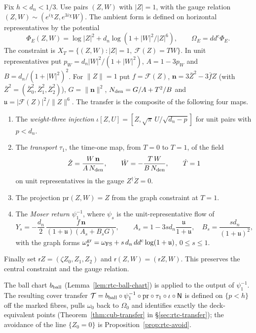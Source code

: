 \begin{construction}\label{cons:cub-transfer}
Fix $h<d_n<1/3$. Use pairs $(Z,W)$ with $|Z|=1$, with the gauge relation
$(Z,W)\sim(e^{i\chi}Z,e^{3i\chi}W)$.
The ambient form is defined on horizontal representatives by the potential
\[
 \Phi_E(Z,W)=\log|Z|^2+d_n\log(1+|W|^2/|Z|^6),\qquad \Omega_E=dd^c\Phi_E.
\]
The constraint is $X_T=\{(Z,W):|Z|=1,\ \mathcal F(Z)=TW\}$.
In unit representatives put $p_W=d_n|W|^2/(1+|W|^2)$, $A=1-3p_W$ and $B=d_n/(1+|W|^2)^2$. For $\|Z\|=1$ put
$f=\mathcal F(Z)$, $\mathbf n=3\bar Z^{2}-3\bar fZ$ (with $\bar Z^2=(\bar Z_0^2,\bar Z_1^2,\bar Z_2^2)$), $G=\|\mathbf n\|^2$,
$N_{\rm den}=G/A+T^2/B$ and $\mathfrak u=|\mathcal F(Z)|^2/\|Z\|^6$. The transfer is the composite of the following four maps.
\begin{enumerate}[label=(\arabic*)]
\item The \emph{weight-three injection} $\iota[Z,U]=[Z,\sqrt\pi\,U/\sqrt{d_n-p}]$ for unit pairs with $p<d_n$.
\item The \emph{transport} $\tau_1$, the time-one map, from $T=0$ to $T=1$, of the field
\[
 \dot Z=\frac{W\,\mathbf n}{A\,N_{\rm den}},\qquad \dot W=-\frac{T\,W}{B\,N_{\rm den}},\qquad \dot T=1
\]
on unit representatives in the gauge $Z^\dagger\dot Z=0$.
\item The projection $\mathrm{pr}(Z,W)=Z$ from the graph constraint at $T=1$.
\item The \emph{Moser return} $\psi_1^{-1}$, where $\psi_s$ is the unit-representative flow of
\[
 Y_s=-\frac{d_n}{2}\,\frac{f\,\mathbf n}{(1+\mathfrak u)(A_s+B_sG)},\qquad A_s=1-3sd_n\frac{\mathfrak u}{1+\mathfrak u},\quad
 B_s=\frac{sd_n}{(1+\mathfrak u)^2},
\]
with the graph forms $\omega^{\rm gr}_s=\omega_{\rm FS}+s\,d_n\,dd^c\log(1+\mathfrak u)$, $0\le s\le1$.
\end{enumerate}
Finally set $\mathsf r Z=(\zeta Z_0,Z_1,Z_2)$ and $\mathsf r(Z,W)=(\mathsf r Z,W)$. This preserves the central constraint and the gauge relation.
\end{construction}

The ball chart $b_{\rm ball}$ (Lemma~\ref{lem:rtc-ball-chart}) is applied to the output of $\psi_1^{-1}$. The resulting
cover transfer $\mathcal T=b_{\rm ball}\circ\psi_1^{-1}\circ\mathrm{pr}\circ\tau_1\circ\iota\circ\mathsf N$ is
defined on $\{p<h\}$ off the marked fibres, pulls $\omega_0$ back to $\Omega_0$ and identifies exactly the deck-equivalent
points (Theorem~\ref{thm:cub-transfer} in \S\ref{sec:rtc-transfer}); the avoidance of the line $\{Z_0=0\}$ is
Proposition~\ref{prop:rtc-avoid}.

